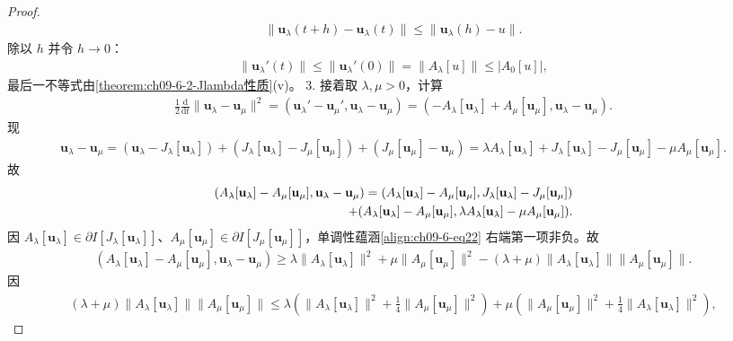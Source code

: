 \documentclass[../../main.tex]{subfiles}
\begin{document}
\begin{theorem}[梯度流的解]
\begin{proof}
\begin{align*}
\|\mathbf{u}_\lambda(t+h)-\mathbf{u}_\lambda(t)\|\leqslant\|\mathbf{u}_\lambda(h)-u\|.
\end{align*}
除以 $h$ 并令 $h\to 0$：
\begin{align}
\|\mathbf{u}_\lambda'(t)\|\leqslant\|\mathbf{u}_\lambda'(0)\|=\|A_\lambda[u]\|\leqslant|A_0[u]|,\label{align:ch09-6-eq20}
\end{align}
最后一不等式由\cref{theorem:ch09-6-2-Jlambda性质}(v)。
3. 接着取 $\lambda,\mu>0$，计算
\begin{align}
\frac12\frac{\mathrm{d}}{\mathrm{d}t}\|\mathbf{u}_\lambda-\mathbf{u}_\mu\|^2=(\mathbf{u}_\lambda'-\mathbf{u}_\mu',\mathbf{u}_\lambda-\mathbf{u}_\mu)=(-A_\lambda[\mathbf{u}_\lambda]+A_\mu[\mathbf{u}_\mu],\mathbf{u}_\lambda-\mathbf{u}_\mu).\label{align:ch09-6-eq21}
\end{align}
现
\begin{align*}
\mathbf{u}_\lambda-\mathbf{u}_\mu=(\mathbf{u}_\lambda-J_\lambda[\mathbf{u}_\lambda])+(J_\lambda[\mathbf{u}_\lambda]-J_\mu[\mathbf{u}_\mu])+(J_\mu[\mathbf{u}_\mu]-\mathbf{u}_\mu)=\lambda A_\lambda[\mathbf{u}_\lambda]+J_\lambda[\mathbf{u}_\lambda]-J_\mu[\mathbf{u}_\mu]-\mu A_\mu[\mathbf{u}_\mu].
\end{align*}
故
\begin{align}
(A_\lambda[\mathbf{u}_\lambda]-A_\mu[\mathbf{u}_\mu],\mathbf{u}_\lambda-\mathbf{u}_\mu)=(A_\lambda[\mathbf{u}_\lambda]-A_\mu[\mathbf{u}_\mu],J_\lambda[\mathbf{u}_\lambda]-J_\mu[\mathbf{u}_\mu])\notag\\
+(A_\lambda[\mathbf{u}_\lambda]-A_\mu[\mathbf{u}_\mu],\lambda A_\lambda[\mathbf{u}_\lambda]-\mu A_\mu[\mathbf{u}_\mu]).\label{align:ch09-6-eq22}
\end{align}
因 $A_\lambda[\mathbf{u}_\lambda]\in\partial I[J_\lambda[\mathbf{u}_\lambda]]$、$A_\mu[\mathbf{u}_\mu]\in\partial I[J_\mu[\mathbf{u}_\mu]]$，单调性蕴涵\eqref{align:ch09-6-eq22} 右端第一项非负。故
\begin{align*}
(A_\lambda[\mathbf{u}_\lambda]-A_\mu[\mathbf{u}_\mu],\mathbf{u}_\lambda-\mathbf{u}_\mu)\geqslant\lambda\|A_\lambda[\mathbf{u}_\lambda]\|^2+\mu\|A_\mu[\mathbf{u}_\mu]\|^2-(\lambda+\mu)\|A_\lambda[\mathbf{u}_\lambda]\|\|A_\mu[\mathbf{u}_\mu]\|.
\end{align*}
因
\begin{align*}
(\lambda+\mu)\|A_\lambda[\mathbf{u}_\lambda]\|\|A_\mu[\mathbf{u}_\mu]\|\leqslant\lambda\left(\|A_\lambda[\mathbf{u}_\lambda]\|^2+\frac14\|A_\mu[\mathbf{u}_\mu]\|^2\right)+\mu\left(\|A_\mu[\mathbf{u}_\mu]\|^2+\frac14\|A_\lambda[\mathbf{u}_\lambda]\|^2\right),

\end{align*}
\end{proof}
\end{theorem}
\end{document}
